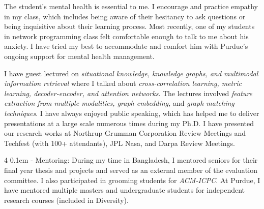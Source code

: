 \documentclass[9pt]{article}
\makeatletter
\def \paragraph {%
    \@startsection{paragraph}%
        {4}%
        \z@%
        {0.1em}
        {-\fontdimen 6 \font}%
        {\normalfont \bfseries}%
    }
\makeatother
\begin{document}
The student's mental health is essential to me. I encourage and practice empathy in my class, which includes being aware of their hesitancy to ask questions or being inquisitive about their learning process. Most recently, one of my students in network programming class felt comfortable enough to talk to me about his anxiety. I have tried my best to accommodate and comfort him with Purdue's ongoing support for mental health management.

I have guest lectured on \textit{situational knowledge, knowledge graphs, and multimodal information retrieval} where I talked about \textit{cross-correlation learning, metric learning, decoder-encoder, and attention networks}. The lectures involved \textit{feature extraction from multiple modalities, graph embedding,} and \textit{graph matching techniques}. I have always enjoyed public speaking, which has helped me to deliver presentations at a large scale numerous times during my Ph.D. I have presented our research works at Northrup Grumman Corporation Review Meetings and Techfest (with 100+ attendants), JPL Nasa, and Darpa Review Meetings.

\paragraph{Mentoring:} During my time in Bangladesh, I mentored seniors for their final year thesis and projects and served as an external member of the evaluation committee. I also participated in grooming students for
\textit{ACM-ICPC}.
At Purdue, I have mentored multiple masters and undergraduate students for independent research courses (included in Diversity). 

\end{document}

